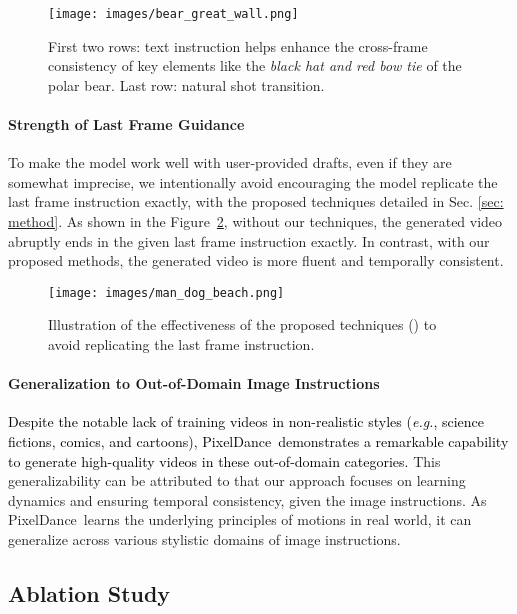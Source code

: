 \documentclass[10pt,twocolumn,letterpaper]{article}
\newcommand{\tcb}{\textcolor{black}}
\newcommand{\ours}{{PixelDance}}
\begin{document}
\begin{figure}[t]
  \centering
  \texttt{[image: images/bear\_great\_wall.png]}
  \caption{
  First two rows: text instruction helps enhance the cross-frame consistency of key elements like the \textit{black hat and red bow tie} of the polar bear. Last row: natural shot transition. 
  }
  \label{fig: bear_great_wall}
\end{figure}




\paragraph{Strength of Last Frame Guidance}
To make the model work well with user-provided drafts, even if they are somewhat imprecise, we intentionally avoid encouraging the model replicate the last frame instruction exactly, with the proposed techniques detailed in Sec. \ref{sec: method}. As shown in the Figure~\ref{fig: man_dog_beach}, without our techniques, the generated video abruptly ends in the given last frame instruction exactly. In contrast, with our proposed methods, the generated video is more fluent and temporally consistent. 


\begin{figure}[t]
  \centering
  \texttt{[image: images/man\_dog\_beach.png]}
  \caption{
  Illustration of the effectiveness of the proposed techniques () to avoid replicating the last frame instruction. 
  }
  \label{fig: man_dog_beach}
\end{figure}


\paragraph{Generalization to Out-of-Domain Image Instructions} 
\tcb{Despite the notable lack of training videos in non-realistic styles (\textit{e.g.}, science fictions, comics, and cartoons), \ours~demonstrates a remarkable capability to generate high-quality videos in these out-of-domain categories.} This generalizability can be attributed to that our approach focuses on learning dynamics and ensuring temporal consistency, given the image instructions. As \ours~learns the underlying principles of motions in real world, it can generalize across various stylistic domains of image instructions. 



\subsection{Ablation Study}
\label{sec: ab}
\end{document}
